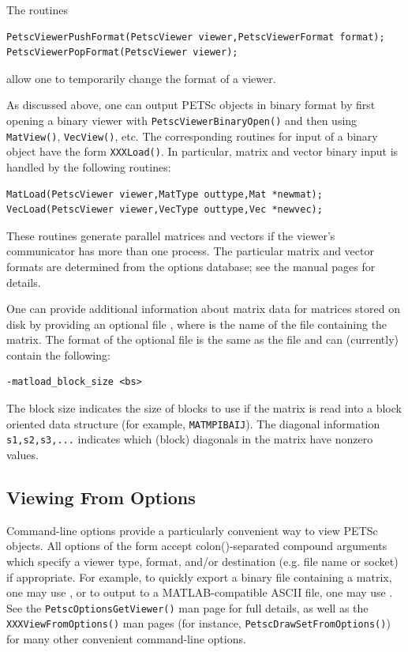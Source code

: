 {{{The routines
\begin{lstlisting}
PetscViewerPushFormat(PetscViewer viewer,PetscViewerFormat format);
PetscViewerPopFormat(PetscViewer viewer);
\end{lstlisting}
allow one to temporarily change the format of a viewer.

As discussed above, one can output PETSc objects in binary format by
first opening a binary viewer with \lstinline{PetscViewerBinaryOpen()} and
then using \lstinline{MatView()}, \lstinline{VecView()}, etc.  The corresponding
routines for input of a binary object have the form \lstinline{XXXLoad()}.  In
particular, matrix and vector binary input is handled by the
following routines:
\begin{lstlisting}
MatLoad(PetscViewer viewer,MatType outtype,Mat *newmat);
VecLoad(PetscViewer viewer,VecType outtype,Vec *newvec);
\end{lstlisting}
These routines generate parallel matrices and vectors if the viewer's
communicator has more than one process.  The particular matrix and
vector formats are determined from the options database; see the
manual pages for details.

One can provide additional information about matrix data for matrices
stored on disk by providing an optional file ,
where  is the name of the file containing the matrix.
The format of the optional file is the same as the  file
and can (currently) contain the following:
\begin{lstlisting}
-matload_block_size <bs>
\end{lstlisting}
The block size indicates the size of blocks to use if the matrix is
read into a block oriented data structure (for example,
\lstinline{MATMPIBAIJ}). The diagonal information
\lstinline{s1,s2,s3,...} indicates
which (block) diagonals in the matrix have nonzero values.

\subsection{Viewing From Options}
\label{sec_viewfromoptions}
Command-line options provide a particularly convenient way to view PETSc objects.
All options of the form  accept colon(\trl{:})-separated compound arguments which
specify a viewer type, format, and/or destination (e.g. file name or socket) if appropriate.
For example, to quickly export a binary file containing a matrix, one may use
,
or to output to a MATLAB-compatible ASCII file, one may use
.
See the \lstinline{PetscOptionsGetViewer()} man page for full details,
as well as the \lstinline{XXXViewFromOptions()} man pages (for instance, \lstinline{PetscDrawSetFromOptions()})
for many other convenient command-line options.

}}}

